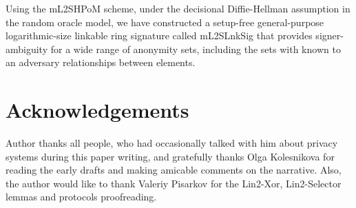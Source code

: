\documentclass{mathcryptology} %
\theoremstyle{title}
\theoremstyle{titleof}
\begin{document}
    Using the mL2SHPoM scheme, under the decisional Diffie-Hellman assumption in the random oracle model, we have constructed a setup-free general-purpose logarithmic-size linkable ring signature called mL2SLnkSig that provides signer-ambiguity for a wide range of anonymity sets, including the sets with known to an adversary relationships between elements.


\section*{Acknowledgements}
    Author thanks all people, who had occasionally talked with him about privacy systems during this paper writing, and gratefully thanks Olga Kolesnikova for reading the early drafts and making amicable comments on the narrative. Also, the author would like to thank Valeriy Pisarkov for the Lin2-Xor, Lin2-Selector lemmas and protocols proofreading.


\printbibliography%
\end{document}
